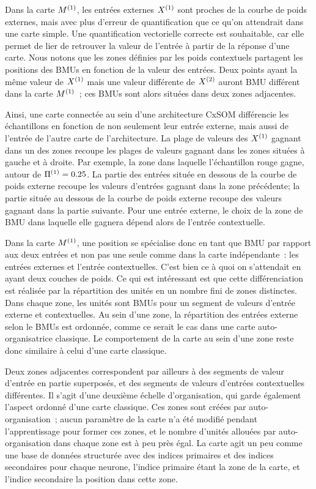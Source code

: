 \documentclass[../main]{subfiles}
\begin{document}
Dans la carte $M^{({1})}$, les entrées externes $X^{({1})}$ sont proches de la courbe de poids externes, mais avec plus d'erreur de quantification que ce qu'on attendrait dans une carte simple. Une quantification vectorielle correcte est souhaitable, car elle permet de lier de retrouver la valeur de l'entrée à partir de la réponse d'une carte.
Nous notons que les zones définies par les poids contextuels partagent les positions des BMUs en fonction de la valeur des entrées. 
Deux points ayant la même valeur de $X^{({1})}$ mais une valeur différente de $X^{({2})}$ auront BMU différent dans la carte $M^{({1})}$~; ces BMUs sont alors situées dans deux zones adjacentes.

Ainsi, une carte connectée au sein d'une architecture CxSOM différencie les échantillons en fonction de non seulement leur entrée externe, mais aussi de l'entrée de l'autre carte de l'architecture. La plage de valeurs des $X^{({1})}$ gagnant dans un des zones recoupe les plages de valeurs gagnant dans les zones situées à gauche et à droite. Par exemple, la zone dans laquelle l'échantillon rouge gagne, autour de $\Pi^{({1})} = 0.25$. La partie des entrées située en dessous de la courbe de poids externe recoupe les valeurs d'entrées gagnant dans la zone précédente; la partie située au dessous de la courbe de poids externe recoupe des valeurs gagnant dans la partie suivante. Pour une entrée externe, le choix de la zone de BMU dans laquelle elle gagnera dépend alors de l'entrée contextuelle. 


Dans la carte $M^{({1})}$, une position se spécialise donc en tant que BMU par rapport aux deux entrées et non pas une seule comme dans la carte indépendante~: les entrées externes et l'entrée contextuelles. C'est bien ce à quoi on s'attendait en ayant deux couches de poids. Ce qui est intéressant est que cette différenciation est réalisée par la répartition des unités en un nombre fini de zones distinctes. Dans chaque zone, les unités sont BMUs pour un segment de valeurs d'entrée externe et contextuelles. Au sein d'une zone, la répartition des entrées externe selon le BMUs est ordonnée, comme ce serait le cas dans une carte auto-organisatrice classique. Le comportement de la carte au sein d'une zone reste donc similaire à celui d'une carte classique.

Deux zones adjacentes correspondent par ailleurs à des segments de valeur d'entrée en partie superposés, et des segments de valeurs d'entrées contextuelles différentes. Il s'agit d'une deuxième échelle d'organisation, qui garde également l'aspect ordonné d'une carte classique. Ces zones sont créées par auto-organisation~; aucun paramètre de la carte n'a été modifié pendant l'apprentissage pour former ces zones, et le nombre d'unités allouées par auto-organisation dans chaque zone est à peu près égal. La carte agit un peu comme une base de données structurée avec des indices primaires et des indices secondaires pour chaque neurone, l'indice primaire étant la zone de la carte, et l'indice secondaire la position dans cette zone.
\end{document}
